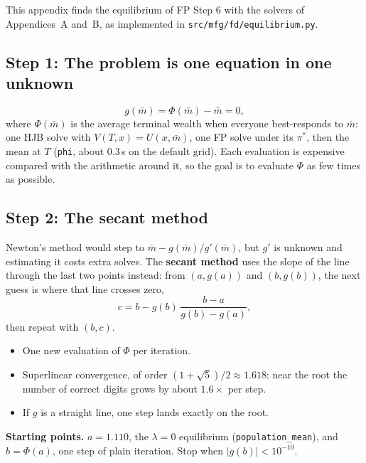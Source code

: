 \documentclass[11pt]{article}
\newcommand{\mb}{\bar m}
\begin{document}
This appendix finds the equilibrium of FP Step 6 with the solvers of Appendices~A and~B, as
implemented in \texttt{src/mfg/fd/equilibrium.py}.

\subsection*{Step 1: The problem is one equation in one unknown}
\[
  g(\mb) = \Phi(\mb) - \mb = 0,
\]
where $\Phi(\mb)$ is the average terminal wealth when everyone best-responds to $\mb$: one HJB
solve with $V(T,x)=U(x,\mb)$, one FP solve under its $\pi^*$, then the mean at $T$
(\texttt{phi}, about 0.3\,s on the default grid). Each evaluation is expensive compared with the
arithmetic around it, so the goal is to evaluate $\Phi$ as few times as possible.

\subsection*{Step 2: The secant method}
Newton's method would step to $\mb-g(\mb)/g'(\mb)$, but $g'$ is unknown and estimating it costs
extra solves. The \textbf{secant method} uses the slope of the line through the last two points
instead: from $(a,g(a))$ and $(b,g(b))$, the next guess is where that line crosses zero,
\[
  \boxed{\;c = b - g(b)\,\frac{b-a}{g(b)-g(a)},\;}
\]
then repeat with $(b,c)$.
\begin{itemize}
  \item One new evaluation of $\Phi$ per iteration.
  \item Superlinear convergence, of order $(1+\sqrt5)/2\approx1.618$: near the root the number
        of correct digits grows by about $1.6\times$ per step.
  \item If $g$ is a straight line, one step lands exactly on the root.
\end{itemize}

\textbf{Starting points.} $a=1.110$, the $\lambda=0$ equilibrium (\texttt{population\_mean}),
and $b=\Phi(a)$, one step of plain iteration. Stop when $|g(b)|<10^{-10}$.
\end{document}
